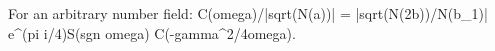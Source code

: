 For an arbitrary number field: C(omega)/|sqrt(N(a))| = |sqrt(N(2b))/N(b_1)| e^{(pi i/4)S(sgn omega)} C(-gamma^2/4omega).
